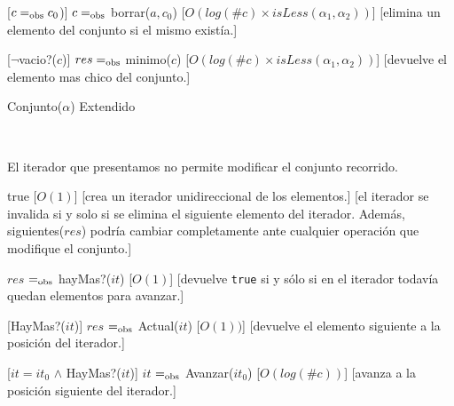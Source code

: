 \begin{Interfaz}
	[$c =_{\mathrm{obs}} c_0$)]
	{$c =_{\mathrm{obs}}$ borrar($a, c_0$)}
	[$O(log(\#c) \times isLess(\alpha_1, \alpha_2)) $]
	[elimina un elemento del conjunto si el mismo existía.]

	[$\neg$vacio?($c$)]
	{$res =_{\mathrm{obs}}$ minimo($c$)}
	[$O(log(\#c) \times isLess(\alpha_1, \alpha_2)) $]
	[devuelve el elemento mas chico del conjunto.]


	\begin{tad}{Conjunto($\alpha$) Extendido}
	\parskip=0pt


	\tadAxiomas

	~

	\end{tad}



	El iterador que presentamos no permite modificar el conjunto recorrido.

	{true}
	[$O(1)$]
	[crea un iterador unidireccional de los elementos.]
	[el iterador se invalida si y solo si se elimina el siguiente elemento del iterador. Además, siguientes($res$) podría cambiar completamente ante cualquier operación que modifique el conjunto.]

	{$res$ $=_{\mathrm{obs}}$ hayMas?($it$)}
	[$O(1)$]
	[devuelve \texttt{true} si y sólo si en el iterador todavía quedan elementos para avanzar.]

	[HayMas?($it$)]
	{$res$ $=_{\mathrm{obs}}$ Actual($it$)}
	[$O(1))$]
	[devuelve el elemento siguiente a la posición del iterador.]

	[$it = it_0$ $\land$ HayMas?($it$)]
	{$it$ $=_{\mathrm{obs}}$ Avanzar($it_0$)}
	[$O(log(\#c))$]
	[avanza a la posición siguiente del iterador.]

\end{Interfaz}


